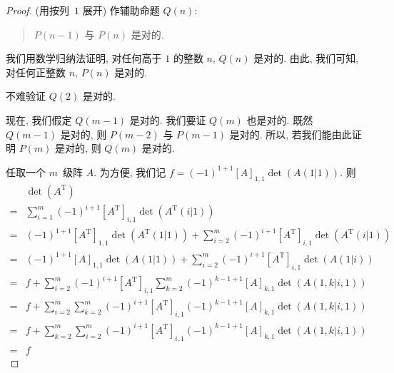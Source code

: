 \documentclass[../libro.tex]{subfiles}
\begin{document}
\begin{proof}
    (用按列~\(1\) 展开)
    作辅助命题 \(Q(n)\):
    \begin{quotation}
        \(P(n-1)\) 与 \(P(n)\) 是对的.
    \end{quotation}
    我们用数学归纳法证明,
    对任何高于 \(1\) 的整数 \(n\), \(Q(n)\) 是对的.
    由此, 我们可知, 对任何正整数 \(n\),
    \(P(n)\) 是对的.

    不难验证 \(Q(2)\) 是对的.

    现在, 我们假定 \(Q(m-1)\) 是对的.
    我们要证 \(Q(m)\) 也是对的.
    既然 \(Q(m-1)\) 是对的,
    则 \(P(m-2)\) 与 \(P(m-1)\) 是对的.
    所以, 若我们能由此证明 \(P(m)\) 是对的,
    则 \(Q(m)\) 是对的.

    任取一个 \(m\)~级阵 \(A\).
    为方便, 我们记
    \(f = (-1)^{1+1} [A]_{1,1} \det {(A(1|1))}\).
    则
    \begingroup
    \reqnomode
    \begin{align*}
        & \det {(A^{\mathrm{T}})}
        \\
        = {} &
        \sum_{i = 1}^{m} {
            (-1)^{i+1} [A^{\mathrm{T}}]_{i,1}
            \det {(A^{\mathrm{T}}(i|1))}
        }
        \\
        = {} &
        (-1)^{1+1} [A^{\mathrm{T}}]_{1,1}
        \det {(A^{\mathrm{T}}(1|1))}
        + \sum_{i = 2}^{m} {
            (-1)^{i+1} [A^{\mathrm{T}}]_{i,1}
            \det {(A^{\mathrm{T}}(i|1))}
        }
        \\
        = {} &
        (-1)^{1+1} [A]_{1,1} \det {(A(1|1))}
        + \sum_{i = 2}^{m} {
            (-1)^{i+1} [A^{\mathrm{T}}]_{i,1}
            \det {(A(1|i))}
        }
        \tag*{(1)}
        \\
        = {} &
        f
        + \sum_{i = 2}^{m} {
            (-1)^{i+1} [A^{\mathrm{T}}]_{i,1}
            \sum_{k = 2}^{m} {
                (-1)^{k-1+1} [A]_{k,1} \det {(A({1,k}|{i,1}))}
            }
        }
        \tag*{(2)}
        \\
        = {} &
        f
        + \sum_{i = 2}^{m} {
            \sum_{k = 2}^{m} {
                (-1)^{i+1} [A^{\mathrm{T}}]_{i,1}
                (-1)^{k-1+1} [A]_{k,1} \det {(A({1,k}|{i,1}))}
            }
        }
        \\
        = {} &
        f
        + \sum_{k = 2}^{m} {
            \sum_{i = 2}^{m} {
                (-1)^{i+1} [A^{\mathrm{T}}]_{i,1}
                (-1)^{k-1+1} [A]_{k,1} \det {(A({1,k}|{i,1}))}
            }
        }
        \\
        = {} &
        f

\end{align*}
\end{proof}
\end{document}
